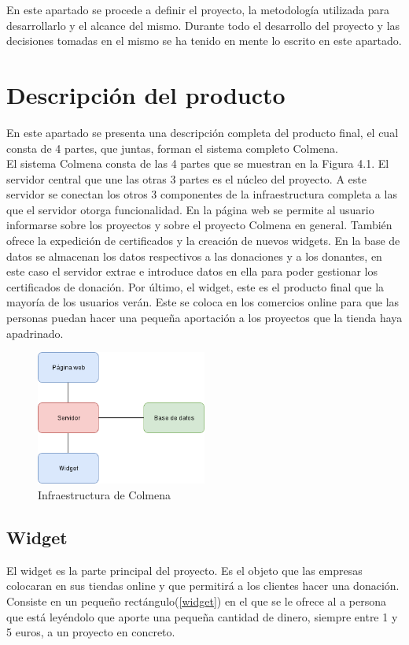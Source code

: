 \small %
En este apartado se procede a definir el proyecto, la metodología utilizada para desarrollarlo y el alcance del mismo. Durante todo el desarrollo del proyecto y las decisiones tomadas en el mismo se ha tenido en mente lo escrito en este apartado.

\section{Descripción del producto}

En este apartado se presenta una descripción completa del producto final, el cual consta de 4 partes, que juntas, forman el sistema completo Colmena.\\

El sistema Colmena consta de las 4 partes que se muestran en la Figura 4.1. El servidor central que une las otras 3 partes es el núcleo del proyecto. A este servidor se conectan los otros 3 componentes de la infraestructura completa a las que el servidor otorga funcionalidad. En la página web se permite al usuario informarse sobre los proyectos y sobre el proyecto Colmena en general. También ofrece la expedición de certificados y la creación de nuevos widgets. En la base de datos se almacenan los datos respectivos a las donaciones y a los donantes, en este caso el servidor extrae e introduce datos en ella para poder gestionar los certificados de donación. Por último, el widget, este es el producto final que la mayoría de los usuarios verán. Este se coloca en los comercios online para que las personas puedan hacer una pequeña aportación a los proyectos que la tienda haya apadrinado.

\begin{figure}[h]
	\centering
	\includegraphics[width=0.5\textwidth]{imgs/descripcion.png}
	\caption{Infraestructura de Colmena}
	\label{infraestructura}
\end{figure}

\subsection{Widget}
El widget es la parte principal del proyecto. Es el objeto que las empresas colocaran en sus tiendas online y que permitirá a los clientes hacer una donación. Consiste en un pequeño rectángulo(\ref{widget}) en el que se le ofrece al a persona que está leyéndolo que aporte una pequeña cantidad de dinero, siempre entre 1 y 5 euros, a un proyecto en concreto. \\

